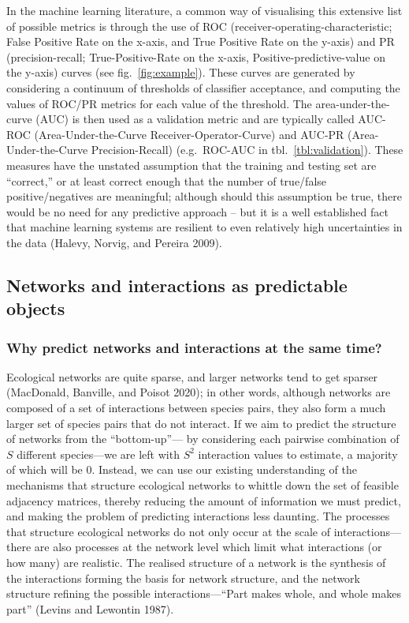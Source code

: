 \documentclass[10pt,oneside]{article}
\begin{document}
In the machine learning literature, a common way of visualising this
extensive list of possible metrics is through the use of ROC
(receiver-operating-characteristic; False Positive Rate on the x-axis,
and True Positive Rate on the y-axis) and PR (precision-recall;
True-Positive-Rate on the x-axis, Positive-predictive-value on the
y-axis) curves (see fig.~\ref{fig:example}). These curves are generated
by considering a continuum of thresholds of classifier acceptance, and
computing the values of ROC/PR metrics for each value of the threshold.
The area-under-the-curve (AUC) is then used as a validation metric and
are typically called AUC-ROC (Area-Under-the-Curve
Receiver-Operator-Curve) and AUC-PR (Area-Under-the-Curve
Precision-Recall) (e.g.~ROC-AUC in tbl.~\ref{tbl:validation}). These
measures have the unstated assumption that the training and testing set
are ``correct,'' or at least correct enough that the number of
true/false positive/negatives are meaningful; although should this
assumption be true, there would be no need for any predictive approach
-- but it is a well established fact that machine learning systems are
resilient to even relatively high uncertainties in the data (Halevy,
Norvig, and Pereira 2009).

\hypertarget{networks-and-interactions-as-predictable-objects}{%
\subsection{Networks and interactions as predictable
objects}\label{networks-and-interactions-as-predictable-objects}}

\hypertarget{why-predict-networks-and-interactions-at-the-same-time}{%
\subsubsection{Why predict networks and interactions at the same
time?}\label{why-predict-networks-and-interactions-at-the-same-time}}

Ecological networks are quite sparse, and larger networks tend to get
sparser (MacDonald, Banville, and Poisot 2020); in other words, although
networks are composed of a set of interactions between species pairs,
they also form a much larger set of species pairs that do not interact.
If we aim to predict the structure of networks from the ``bottom-up''---
by considering each pairwise combination of \(S\) different species---we
are left with \(S^2\) interaction values to estimate, a majority of
which will be 0. Instead, we can use our existing understanding of the
mechanisms that structure ecological networks to whittle down the set of
feasible adjacency matrices, thereby reducing the amount of information
we must predict, and making the problem of predicting interactions less
daunting. The processes that structure ecological networks do not only
occur at the scale of interactions---there are also processes at the
network level which limit what interactions (or how many) are realistic.
The realised structure of a network is the synthesis of the interactions
forming the basis for network structure, and the network structure
refining the possible interactions---``Part makes whole, and whole makes
part'' (Levins and Lewontin 1987).
\end{document}
